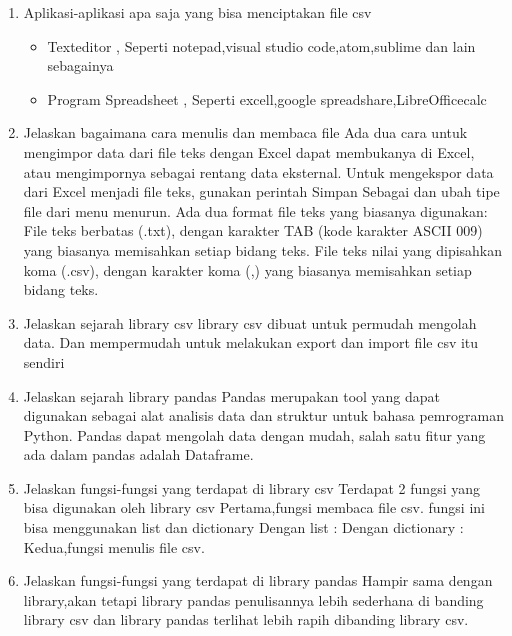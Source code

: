 \begin{enumerate}
\item Aplikasi-aplikasi apa saja yang bisa menciptakan file csv
\begin{itemize}
\item Texteditor , Seperti notepad,visual studio code,atom,sublime dan lain sebagainya
\item Program Spreadsheet , Seperti excell,google spreadshare,LibreOfficecalc
\end{itemize}
\item Jelaskan bagaimana cara menulis dan membaca file
 Ada dua cara untuk mengimpor data dari file teks dengan Excel dapat membukanya di Excel, atau mengimpornya sebagai rentang data eksternal. Untuk mengekspor data dari Excel menjadi file teks, gunakan perintah Simpan Sebagai dan ubah tipe file dari menu menurun.
Ada dua format file teks yang biasanya digunakan:
File teks berbatas (.txt), dengan karakter TAB (kode karakter ASCII 009) yang biasanya memisahkan setiap bidang teks.
File teks nilai yang dipisahkan koma (.csv), dengan karakter koma (,) yang biasanya memisahkan setiap bidang teks.
\item Jelaskan sejarah library csv
library csv dibuat untuk permudah mengolah data. Dan mempermudah untuk melakukan export dan import file csv itu sendiri
\item Jelaskan sejarah library pandas
Pandas merupakan tool yang dapat digunakan sebagai alat analisis data dan struktur untuk bahasa pemrograman Python. Pandas dapat mengolah data dengan mudah, salah satu fitur yang ada dalam pandas adalah Dataframe.
\item Jelaskan fungsi-fungsi yang terdapat di library csv
Terdapat 2 fungsi yang bisa digunakan oleh library csv
Pertama,fungsi membaca file csv.
fungsi ini bisa menggunakan list dan dictionary
Dengan list :
%
Dengan dictionary :
%
Kedua,fungsi menulis file csv.
%
\item Jelaskan fungsi-fungsi yang terdapat di library pandas
Hampir sama dengan library,akan tetapi library pandas penulisannya lebih sederhana di banding library csv dan library pandas terlihat lebih rapih dibanding library csv.
%
\end{enumerate}

